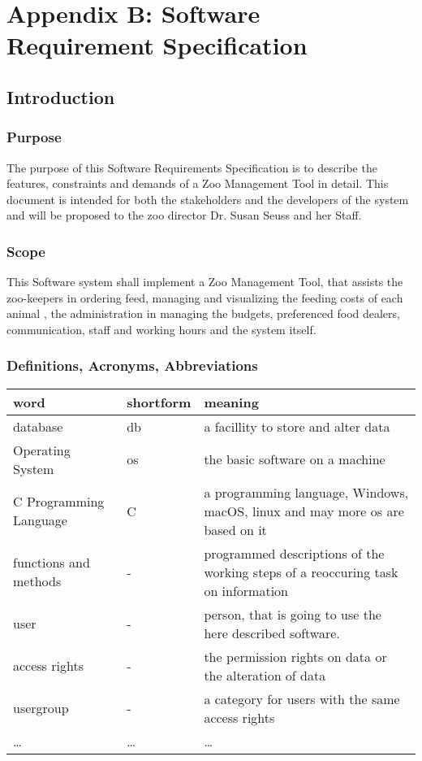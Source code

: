 \section{Appendix B: Software Requirement Specification}

\subsection{Introduction}
	\subsubsection{Purpose}
			The purpose of this Software Requirements Specification is to describe the features, constraints and demands of a Zoo Management Tool in detail. This document is intended for both the stakeholders and the developers of the system and will be proposed to the zoo director Dr. Susan Seuss and her Staff.
	\subsubsection{Scope}
			This Software system shall implement a Zoo Management Tool, that assists the zoo-keepers in ordering feed, managing and visualizing the feeding costs of each animal , the administration in managing the budgets, preferenced food dealers, communication, staff and working hours and the system itself.

	\subsubsection{Definitions, Acronyms, Abbreviations}
	\begin{longtable}{|>{\raggedright \arraybackslash}p{3.0cm}||
	>{\raggedright \arraybackslash}p{2.0cm}|>{\raggedright \arraybackslash}p{10.0cm}|} \hline

	word & shortform & meaning \\ \hline
	database & db & a facillity to store and alter data \\ \hline
	Operating System & os & the basic software on a machine \\ \hline
	C Programming Language & C & a programming language, Windows, macOS, linux and may more os are based on it \\ \hline
	functions and methods & - & programmed descriptions of the working steps of a reoccuring task on information \\ \hline
	user & - & person, that is going to use the here described software. \\ \hline
	access rights & - & the permission rights on data or the alteration of data \\ \hline
	usergroup & - & a category for users with the same access rights \\ \hline
	\dots & \dots & \dots \\ \hline
	\hline
	\end{longtable}


